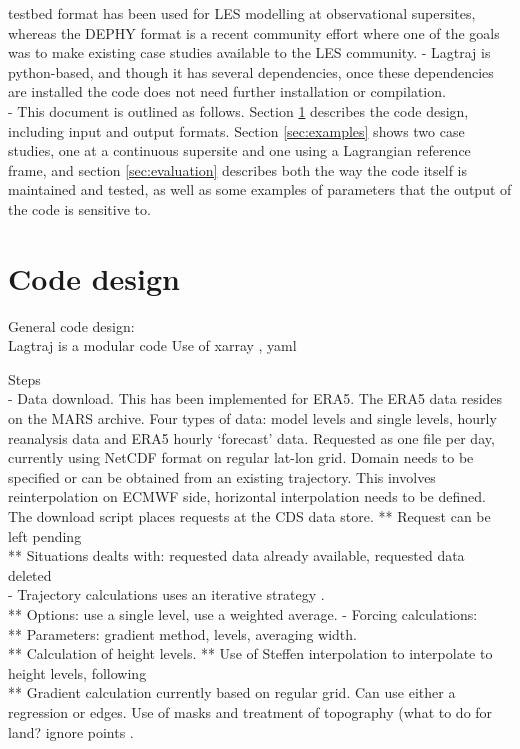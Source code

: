 \documentclass[a4paper,11pt]{article}
\begin{document}
testbed format has been used for LES modelling at observational
supersites, whereas the DEPHY format is a recent community effort where
one of the goals was to make existing case studies available to the LES
community.
- Lagtraj is python-based, and though it has several dependencies, once
these dependencies are installed the code does not need further
installation or compilation. \\
- This document is outlined as follows. Section \ref{sec:design}
describes the code design, including input and output formats. Section
\ref{sec:examples} shows two case studies, one at a continuous supersite
and one using a Lagrangian reference frame, and section
\ref{sec:evaluation} describes both the way the code itself is
maintained and tested, as well as some examples of parameters that the
output of the code is sensitive to. \\

\section{Code design}\label{sec:design}

General code design: \\
Lagtraj is a modular code
Use of xarray \citep{hoyer2017}, yaml \citep{ben2009}

Steps \\
- Data download. This has been implemented for ERA5. The ERA5 data
resides on the MARS archive. Four types of data: model levels and
single levels, hourly reanalysis data and ERA5 hourly `forecast' data.
Requested as one file per day, currently using NetCDF format on regular
lat-lon grid. Domain needs to be specified or can be obtained from an
existing trajectory. This involves reinterpolation on ECMWF side,
horizontal interpolation needs to be defined. The download script
places requests at the CDS data store.
** Request can be left pending \\
** Situations dealts with: requested data already available, requested data deleted \\
- Trajectory calculations uses an iterative strategy \citep{petterssen1956,sprenger2015}. \\
** Options: use a single level, use a weighted average.
- Forcing calculations: \\
** Parameters: gradient method, levels, averaging width. \\
** Calculation of height levels.
** Use of Steffen interpolation to interpolate to height levels, following \cite{yamaguchi2012} \\
** Gradient calculation currently based on regular grid. Can use either a regression or edges. Use of masks and treatment of topography (what to do for land? ignore points . \\
\end{document}
